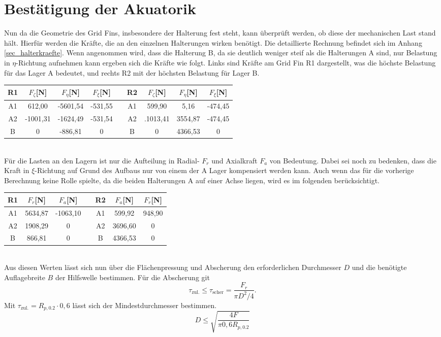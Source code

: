 \section{Bestätigung der Akuatorik}
Nun da die Geometrie des Grid Fins, insbesondere der Halterung fest steht, kann überprüft werden, ob diese der mechanischen Last stand hält. Hierfür werden die Kräfte, die an den einzelnen Halterungen wirken benötigt. Die detaillierte Rechnung befindet sich im Anhang \ref{sec_halterkraefte}. Wenn angenommen wird, dass die Halterung B, da sie deutlich weniger steif als die Halterungen A sind, nur Belastung in $\eta$-Richtung aufnehmen kann ergeben sich die Kräfte wie folgt. Links sind Kräfte am Grid Fin R1 dargestellt, was die höchste Belastung für das Lager A bedeutet, und rechts R2 mit der höchsten Belastung für Lager B.
\begin{table}[h] 
	\centering 
	\begin{tabular}{c|c|c|cc||c|c|c|c} 
		\textbf{R1}&$F_{\zeta}$[N]&$F_\eta$[N]&$F_\xi$[N]&&\textbf{R2}&$F_{\zeta}$[N]&$F_\eta$[N]&$F_\xi$[N]\\ 
		\hline 
		A1& 612,00&-5601,54&-531,55&&A1&599,90&5,16&-474,45\\
		A2&-1001,31&-1624,49&-531,54&&A2&.1013,41&3554,87&-474,45\\
		B&0&-886,81&0&&B&0&4366,53&0\\
	\end{tabular}
\end{table} \\
Für die Lasten an den Lagern ist nur die Aufteilung in Radial- $F_r$ und Axialkraft $F_a$ von Bedeutung. Dabei sei noch zu bedenken, dass die Kraft in $\xi$-Richtung auf Grund des Aufbaus nur von einem der A Lager kompensiert werden kann. Auch wenn das für die vorherige Berechnung keine Rolle spielte, da die beiden Halterungen A auf einer Achse liegen, wird es im folgenden berücksichtigt.
\begin{table}[h] 
	\centering 
	\begin{tabular}{c|c|cc||c|c|c} 
		\textbf{R1}&$F_{r}$[N]&$F_a$[N]&&\textbf{R2}&$F_{a}$[N]&$F_r$[N]\\ 
		\hline 
		A1& 5634,87&-1063,10&&A1&599,92&948,90\\
		A2&1908,29&0&&A2&3696,60&0\\
		B&866,81&0&&B&4366,53&0\\
	\end{tabular}
\end{table} \\
Aus diesen Werten lässt sich nun über die Flächenpressung und Abscherung den erforderlichen Durchmesser $D$ und die benötigte Auflagebreite $B$ der Hilfswelle bestimmen. Für die Abscherung git
\begin{equation}
	\tau_{\mathrm{zul.}}\leq\tau_\mathrm{scher}=\frac{F_r}{\pi D^2/4}.
\end{equation}
Mit $\tau_{\mathrm{zul.}}=R_{p, 0.2}\cdot 0,6$ \cite{metall} lässt sich der Mindestdurchmesser bestimmen.
\begin{equation}
	D \leq \sqrt{\frac{4F}{\pi 0,6 R_{p, 0.2}}}
\end{equation}

